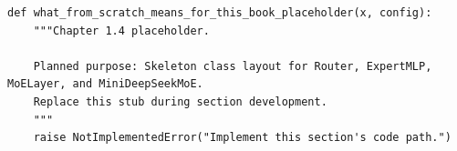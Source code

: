 \begin{lstlisting}[style=bookpython,caption={Planned code placeholder for what from scratch means for this book.},label={lst:ch01-what-from-scratch-means-for-this-book}]
def what_from_scratch_means_for_this_book_placeholder(x, config):
    """Chapter 1.4 placeholder.

    Planned purpose: Skeleton class layout for Router, ExpertMLP, MoELayer, and MiniDeepSeekMoE.
    Replace this stub during section development.
    """
    raise NotImplementedError("Implement this section's code path.")
\end{lstlisting}
